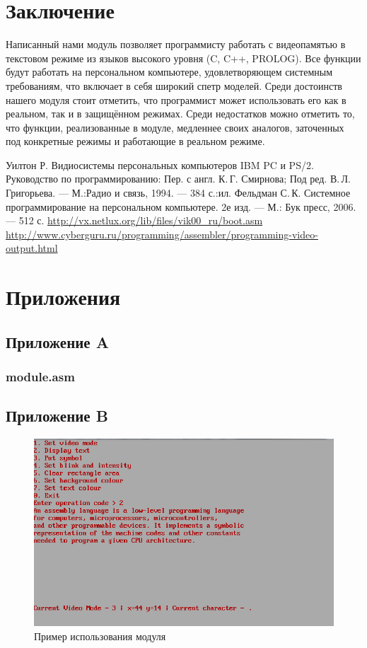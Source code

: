 \documentclass[a4paper,12pt,notitlepage,pdftex,headsepline]{scrartcl}
\def\baselinestretch{1.5}
\begin{document}
\section*{Заключение}
Написанный нами модуль позволяет программисту работать с видеопамятью в текстовом режиме из языков высокого уровня (C, C++, PROLOG).
Все функции будут работать на персональном компьютере, удовлетворяющем системным требованиям, что включает в себя широкий спетр моделей.
Среди достоинств нашего модуля стоит отметить, что программист может использовать его как в реальном, так и в защищённом режимах.
Среди недостатков можно отметить то, что функции, реализованные в модуле, медленнее своих аналогов, заточенных под конкретные режимы и работающие в реальном режиме.
\newpage
{}
\begin{thebibliography}{0}
Уилтон Р. Видиосистемы персональных компьютеров IBM PC и PS/2. Руководство по программированию: Пер. с англ. К.\,Г. Смирнова; Под ред. В.\,Л. Григорьева. --- М.:Радио и связь, 1994. --- 384 с.:ил.
Фельдман С.\,К. Системное программирование на персональном компьютере. 2е изд. --- М.: Бук пресс, 2006. --- 512 с.
\url{http://vx.netlux.org/lib/files/vik00\_ru/boot.asm}
\url{http://www.cyberguru.ru/programming/assembler/programming-video-output.html}
\end{thebibliography}
\newpage
{}
\def\baselinestretch{1}
\section*{Приложения}
\subsection*{Приложение A}
\subsubsection*{module.asm}
\begin{footnotesize}

\end{footnotesize}

\newpage
\subsection*{Приложение B}
\begin{figure}[!h]
\includegraphics[scale=1]{1.png}
\caption{Пример использования модуля}
\end{figure}
%
\end{document}
